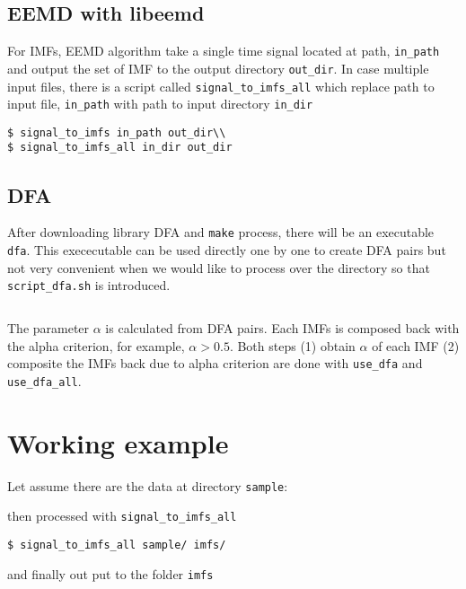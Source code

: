 \documentclass{article}
\begin{document}
\subsection*{EEMD with libeemd}
For IMFs, EEMD algorithm take a single time signal located at path, \texttt{in\_path} and output the set of IMF to the output directory \texttt{out\_dir}. In case multiple input files, there is a script called \texttt{signal\_to\_imfs\_all} which replace path to input file, \texttt{in\_path} with path to input directory \texttt{in\_dir}
\begin{verbatim}
$ signal_to_imfs in_path out_dir\\
$ signal_to_imfs_all in_dir out_dir
\end{verbatim}
\subsection*{DFA}
After downloading library DFA and \texttt{make} process, there will be an executable \texttt{dfa}. This exececutable can be used directly one by one to create DFA pairs but not very convenient when we would like to process over the directory so that \texttt{script\_dfa.sh} is introduced.\\
\begin{verbatim}
\end{verbatim}

The parameter $\alpha$ is calculated from DFA pairs. Each IMFs is composed back with the alpha criterion, for example, $\alpha > 0.5$. Both steps (1) obtain $\alpha$ of each IMF (2) composite the IMFs back due to alpha criterion are done with \texttt{use\_dfa} and \texttt{use\_dfa\_all}.

\section*{Working example}
Let assume there are the data at directory \texttt{sample}:

then processed with \texttt{signal\_to\_imfs\_all}
\begin{verbatim}
$ signal_to_imfs_all sample/ imfs/
\end{verbatim}
and finally out put to the folder \texttt{imfs}

\end{document}
